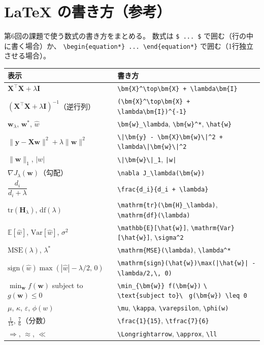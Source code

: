 \documentclass[a4paper,dvipdfmx]{jsarticle}
\newcommand{\提出期限}{2026年11月2日（月）}
\newcommand{\学籍番号}{0000000}
\newcommand{\氏名}{氏名を書く}
\newcommand{\提出日}{2026年11月2日}
\begin{document}
\newpage
\section*{LaTeX の書き方（参考）}

第6回の課題で使う数式の書き方をまとめる。
数式は \verb|$ ... $| で囲む（行の中に書く場合）か、
\verb|\begin{equation*} ... \end{equation*}| で囲む（1行独立させる場合）。

\begin{center}
\small
\begin{tabular}{l|l}
\hline
表示 & 書き方 \\
\hline\hline
$\bm{X}^\top\bm{X} + \lambda\bm{I}$ & \verb|\bm{X}^\top\bm{X} + \lambda\bm{I}| \\
$(\bm{X}^\top\bm{X} + \lambda\bm{I})^{-1}$（逆行列） & \verb|(\bm{X}^\top\bm{X} + \lambda\bm{I})^{-1}| \\
$\bm{w}_\lambda$, $\bm{w}^*$, $\hat{w}$ & \verb|\bm{w}_\lambda|, \verb|\bm{w}^*|, \verb|\hat{w}| \\
$\|\bm{y} - \bm{X}\bm{w}\|^2 + \lambda\|\bm{w}\|^2$ & \verb!\|\bm{y} - \bm{X}\bm{w}\|^2 + \lambda\|\bm{w}\|^2! \\
$\|\bm{w}\|_1$, $|w|$ & \verb+\|\bm{w}\|_1+, \verb+|w|+ \\
$\nabla J_\lambda(\bm{w})$（勾配） & \verb|\nabla J_\lambda(\bm{w})| \\
$\dfrac{d_i}{d_i + \lambda}$ & \verb|\frac{d_i}{d_i + \lambda}| \\
$\mathrm{tr}(\bm{H}_\lambda)$, $\mathrm{df}(\lambda)$ & \verb|\mathrm{tr}(\bm{H}_\lambda)|, \verb|\mathrm{df}(\lambda)| \\
$\mathbb{E}[\hat{w}]$, $\mathrm{Var}[\hat{w}]$, $\sigma^2$ & \verb|\mathbb{E}[\hat{w}]|, \verb|\mathrm{Var}[\hat{w}]|, \verb|\sigma^2| \\
$\mathrm{MSE}(\lambda)$, $\lambda^*$ & \verb|\mathrm{MSE}(\lambda)|, \verb|\lambda^*| \\
$\mathrm{sign}(\hat{w})\max(|\hat{w}| - \lambda/2,\, 0)$ & \verb!\mathrm{sign}(\hat{w})\max(|\hat{w}| - \lambda/2,\, 0)! \\
$\min_{\bm{w}} f(\bm{w})$ subject to $g(\bm{w}) \leq 0$ & \verb|\min_{\bm{w}} f(\bm{w})| \verb|\ \text{subject to}\ | \verb|g(\bm{w}) \leq 0| \\
$\mu$, $\kappa$, $\varepsilon$, $\phi(w)$ & \verb|\mu|, \verb|\kappa|, \verb|\varepsilon|, \verb|\phi(w)| \\
$\frac{1}{15}$, $\tfrac{7}{6}$（分数） & \verb|\frac{1}{15}|, \verb|\tfrac{7}{6}| \\
$\Longrightarrow$, $\approx$, $\ll$ & \verb|\Longrightarrow|, \verb|\approx|, \verb|\ll| \\
\hline
\end{tabular}
\end{center}
\end{document}
